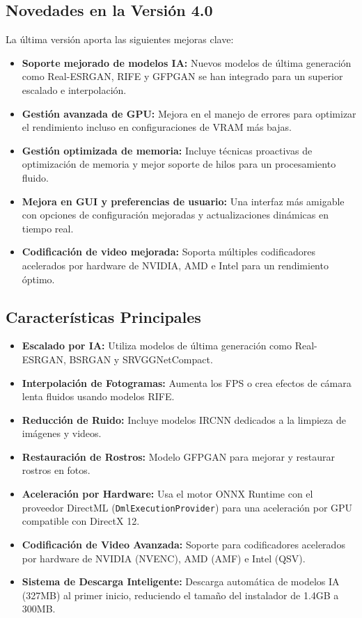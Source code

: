 \documentclass[11pt, a4paper]{article}
\begin{document}
\subsection{Novedades en la Versión 4.0}
La última versión aporta las siguientes mejoras clave:
\begin{itemize}[leftmargin=*]
    \item \textbf{Soporte mejorado de modelos IA:} Nuevos modelos de última generación como Real-ESRGAN, RIFE y GFPGAN se han integrado para un superior escalado e interpolación.
    \item \textbf{Gestión avanzada de GPU:} Mejora en el manejo de errores para optimizar el rendimiento incluso en configuraciones de VRAM más bajas.
    \item \textbf{Gestión optimizada de memoria:} Incluye técnicas proactivas de optimización de memoria y mejor soporte de hilos para un procesamiento fluido.
    \item \textbf{Mejora en GUI y preferencias de usuario:} Una interfaz más amigable con opciones de configuración mejoradas y actualizaciones dinámicas en tiempo real.
    \item \textbf{Codificación de video mejorada:} Soporta múltiples codificadores acelerados por hardware de NVIDIA, AMD e Intel para un rendimiento óptimo.
\end{itemize}

\subsection{Características Principales}
\begin{itemize}[leftmargin=*]
    \item \textbf{Escalado por IA:} Utiliza modelos de última generación como Real-ESRGAN, BSRGAN y SRVGGNetCompact.
    \item \textbf{Interpolación de Fotogramas:} Aumenta los FPS o crea efectos de cámara lenta fluidos usando modelos RIFE.
    \item \textbf{Reducción de Ruido:} Incluye modelos IRCNN dedicados a la limpieza de imágenes y videos.
    \item \textbf{Restauración de Rostros:} Modelo GFPGAN para mejorar y restaurar rostros en fotos.
    \item \textbf{Aceleración por Hardware:} Usa el motor ONNX Runtime con el proveedor DirectML (\texttt{DmlExecutionProvider}) para una aceleración por GPU compatible con DirectX 12.
    \item \textbf{Codificación de Video Avanzada:} Soporte para codificadores acelerados por hardware de NVIDIA (NVENC), AMD (AMF) e Intel (QSV).
    \item \textbf{Sistema de Descarga Inteligente:} Descarga automática de modelos IA (327MB) al primer inicio, reduciendo el tamaño del instalador de 1.4GB a 300MB.
\end{itemize}
\end{document}
